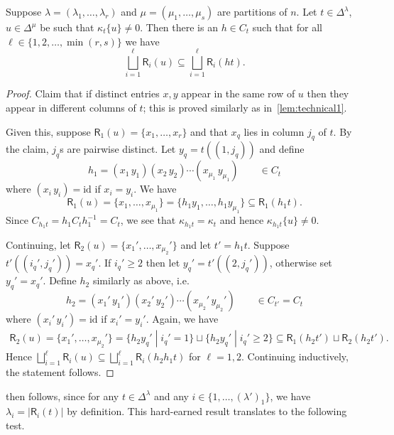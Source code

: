 \begin{lemma}
    Suppose $\lambda=(\lambda_1,\ldots,\lambda_r)$ and
    $\mu=(\mu_1,\ldots,\mu_s)$ are partitions of $n$. Let $t\in
    \Delta^\lambda$, $u\in \Delta^\mu$ be such that $\kappa_t\{u\}\neq
    0$. Then      there is an $h\in C_t$ such that for all $\ell\in
    \{1,2,\ldots,\min(r,s)\}$ we have \[\bigsqcup_{i=1}^\ell
    \mathsf{R}_i(u)\subseteq \bigsqcup_{i=1}^\ell \mathsf{R}_i(ht).\]

    \begin{proof}
        Claim that if distinct entries $x,y$ appear in the same row of $u$ then
        they appear in different columns of $t$; this is proved similarly as
        in~\cref{lem:technical1}. 

        Given this, suppose $\mathsf{R}_1(u)=\{x_1,\ldots, x_r\}$ and that $x_q$
        lies in column $j_q$ of $t$. By the claim, $j_q$s are pairwise distinct.
        Let $y_q=t((1,j_q))$ and define
        \[
            h_1= (x_1\,y_1)(x_2\,y_2)\cdots (x_{\mu_1}\,y_{\mu_1})\qquad\in C_t
        \]
        where $(x_i\,y_i)=\text{id}$ if $x_i=y_i$.
        We have
        \[\mathsf{R}_1(u)=\{x_1,\ldots,x_{\mu_1}\}=\{h_1y_1,\ldots,h_1y_{\mu_1}\}\subseteq
        \mathsf{R}_1(h_1t).\] Since $C_{h_1t}=h_1C_th_1^{-1}=C_t$, we see that
        $\kappa_{h_1t}=\kappa_t$ and hence $\kappa_{h_1t}\{u\}\neq 0$. 

        Continuing, let $\mathsf{R}_2(u)=\{x_1',\ldots,x_{\mu_2}'\}$ and let $t'=h_1t$. Suppose
        $t'((i_q',j_q'))=x_q'$. If $i_q'\geq 2$ then let $y_q'=t'((2,j_q'))$,
        otherwise set $y_q'=x_q'$.
        Define $h_2$ similarly as above, i.e.\ 
        \[
            h_2= (x_1'\,y_1')(x_2'\,y_2')\cdots (x_{\mu_2}'\,y_{\mu_2}')\qquad\in C_{t'}=C_t
        \] 
        where $(x_i'\,y_i')=\text{id}$ if $x_i'=y_i'$. Again, we have 
        \begin{align*}
            \mathsf{R}_2(u)=\{x_1',\ldots,x_{\mu_2}'\} = \{h_2y_q'\;|\;
                           i_q'=1\}\sqcup \{h_2y_q'\;|\; i_q'\geq 2\}  \subseteq
                   \mathsf{R}_1(h_2t')\sqcup\mathsf{R}_2(h_2t').
        \end{align*}
        Hence
        $\bigsqcup_{i=1}^\ell \mathsf{R}_i(u)\subseteq \bigsqcup_{i=1}^\ell
        \mathsf{R}_i(h_2h_1t)$ for $\ell=1,2$. Continuing inductively, the
        statement follows. 
    \end{proof}
\end{lemma}


 then follows, since for any $t\in
\Delta^\lambda$ and any $i \in \{1,\ldots, (\lambda')_1\}$, we have
$\lambda_i=|\mathsf{R}_i(t)|$ by definition. This hard-earned result translates
to the following test.

